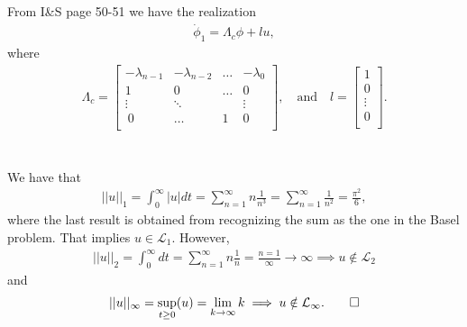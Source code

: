 \documentclass[]{article}
\begin{document}
\subsection{}
From I\&S page 50-51 we have the realization
\begin{equation}\begin{aligned}
\dot \phi_1 = \Lambda_c \phi + l u,
\end{aligned}\end{equation}
where
\begin{equation}\begin{aligned}
\Lambda_c =
\begin{bmatrix}
-\lambda_{n-1} & -\lambda_{n-2} & \dots & -\lambda_0\\
1 & 0 & \dots & 0 \\
\vdots & \ddots &  & \vdots \\\
0 & \dots & 1 & 0 \\
\end{bmatrix}, \quad \text{and} \quad
l =
\begin{bmatrix}
1\\
0\\
\vdots \\
0 \\
\end{bmatrix}.
\end{aligned}\end{equation}

\section{}
\subsection{}
We have that
\begin{equation}\begin{aligned}
||u||_1 = \int^{\infty}_{0}|u|dt = \sum_{n=1}^{\infty}n \frac{1}{n^3} = \sum_{n=1}^{\infty}\frac{1}{n^2} = \frac{\pi^2}{6},
\end{aligned}\end{equation}
where the last result is obtained from recognizing the sum as the one in the Basel problem. That implies $u \in \mathcal{L}_1$. However,
\begin{equation}\begin{aligned}
||u||_2 = \int^{\infty}_{0}dt = \sum_{n=1}^{\infty}n \frac{1}{n} = \frac{n=1}{\infty} \rightarrow \infty \implies u \notin \mathcal{L}_2
\end{aligned}\end{equation}
and
\begin{equation}\begin{aligned}
||u||_\infty = \sup_{t\geq 0} (u) = \lim_{k\rightarrow \infty} k \implies u \notin \mathcal{L}_\infty. \qed
\end{aligned}\end{equation}
\end{document}

